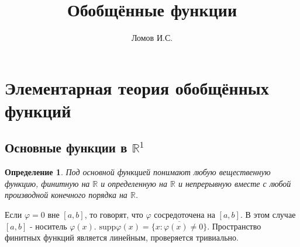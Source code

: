 \documentclass[9pt, a4paper]{article}
\title{Обобщённые функции}
\author{Ломов И.С.}
\date{}
\newtheorem*{definition}{Определение}
\begin{document}
\maketitle
\section*{Элементарная теория обобщённых функций}
	\subsection*{Основные функции в $\mathbb{R}^1$}
		\begin{definition}
			Под основной функцией понимают любую вещественную функцию,  финитную на $\mathbb{R}$ и определенную на $\mathbb{R}$ и непрерывную вместе с любой производной конечного порядка на $\mathbb{R}$.
		\end{definition}
		Если $\varphi = 0$ вне $[a,b]$, то говорят, что $\varphi$ сосредоточена на $[a,b]$. В этом случае $[a,b]$ - носитель $\varphi(x)$. $\mathrm{supp} \varphi(x) = \overline{\{x: \varphi(x) \neq 0\}}$.
		Пространство финитных функций является линейным, проверяется тривиально.
\end{document}
